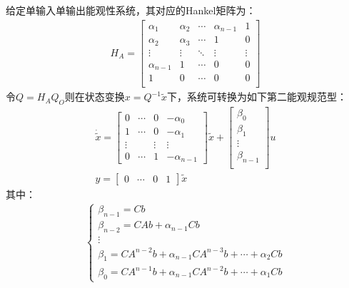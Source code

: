 \begin{theorem}[第二能观规范型]
    给定单输入单输出能观性系统，其对应的Hankel矩阵为：
    \begin{gather*}
        H_A = \begin{bmatrix}
            \alpha_1     & \alpha_2 & \cdots & \alpha_{n-1}  & 1       \\
            \alpha_2     & \alpha_3 & \cdots & 1             & 0       \\
            \vdots       & \vdots   & \ddots & \vdots        & \vdots  \\
            \alpha_{n-1} & 1        & \cdots & 0             & 0       \\
            1            & 0        & \cdots & 0             & 0       \\
        \end{bmatrix}
    \end{gather*}
    令$Q = H_A Q_O$则在状态变换$x = Q^{-1} \tilde{x}$下，系统可转换为如下第二能观规范型：
    \begin{gather*}
        \dot{\tilde{x}} = \begin{bmatrix}
            0 & \cdots & 0 & -\alpha_0 \\
            1 & \cdots & 0 & -\alpha_1 \\
            \vdots & & \vdots & \vdots \\
            0 & \cdots & 1 & -\alpha_{n-1} 
        \end{bmatrix} \tilde{x} + \begin{bmatrix}
            \beta_0 \\ \beta_1 \\ \vdots \\ \beta_{n-1} \\
        \end{bmatrix} u  \\
        y = \begin{bmatrix}
            0 & \cdots & 0 & 1
        \end{bmatrix} \tilde{x}
    \end{gather*}
    其中：
    \begin{gather*}
        \begin{cases}
            \beta_{n-1} = C b \\
            \beta_{n-2} = C A b + \alpha_{n-1} C b \\
            \vdots \\
            \beta_1 = C A^{n-2} b + \alpha_{n-1} C A^{n-3} b + \cdots + \alpha_2 C b \\
            \beta_0 = C A^{n-1} b + \alpha_{n-1} C A^{n-2} b + \cdots + \alpha_1 C b 
        \end{cases}
    \end{gather*}
\end{theorem}

